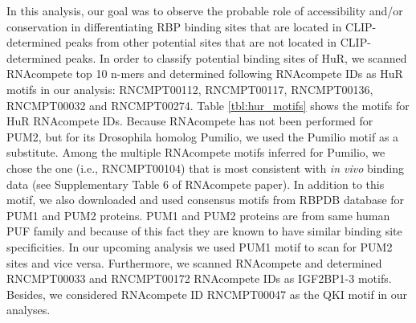 In this analysis, our goal was to observe the probable role of accessibility and/or conservation in differentiating RBP binding sites that are located in CLIP-determined peaks from other potential sites that are not located in CLIP-determined peaks. In order to classify potential binding sites of HuR, we scanned RNAcompete top 10 n-mers and determined following RNAcompete IDs as HuR motifs in our analysis: RNCMPT00112, RNCMPT00117, RNCMPT00136, RNCMPT00032 and RNCMPT00274. Table \ref{tbl:hur_motifs} shows the motifs for HuR RNAcompete IDs. Because RNAcompete has not been performed for PUM2, but for its Drosophila homolog Pumilio, we used the Pumilio motif as a substitute. Among the multiple RNAcompete motifs inferred for Pumilio, we chose the one (i.e., RNCMPT00104) that is most consistent with \textit{in vivo} binding data (see Supplementary Table 6 of RNAcompete paper). In addition to this motif, we also downloaded and used consensus motifs from RBPDB database for PUM1 and PUM2 proteins. PUM1 and PUM2 proteins are from same human PUF family and because of this fact they are known to have similar binding site specificities. In our upcoming analysis we used PUM1 motif to scan for PUM2 sites and vice versa. Furthermore, we scanned RNAcompete and determined RNCMPT00033 and RNCMPT00172 RNAcompete IDs as IGF2BP1-3 motifs. Besides, we considered RNAcompete ID RNCMPT00047 as the QKI motif in our analyses.


